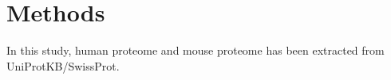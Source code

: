 \section{Methods}
In this study, human proteome and mouse proteome has been extracted from UniProtKB/SwissProt. 


